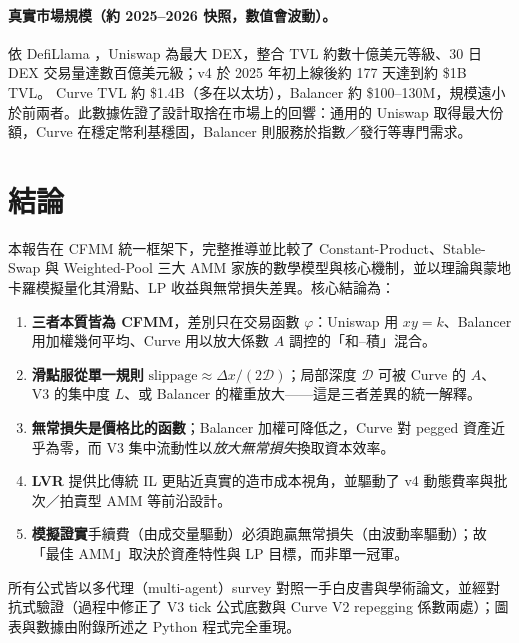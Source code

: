 \documentclass[11pt,a4paper]{article}
\begin{document}
\paragraph{真實市場規模（約 2025--2026 快照，數值會波動）。}
依 DefiLlama \citep{defillamauniswap,defillamacurve,defillamabalancer}，Uniswap 為最大 DEX，整合 TVL 約數十億美元等級、30 日 DEX 交易量達數百億美元級；v4 於 2025 年初上線後約 177 天達到約 \$1B TVL。
Curve TVL 約 \$1.4B（多在以太坊），Balancer 約 \$100--130M，規模遠小於前兩者。此數據佐證了設計取捨在市場上的回響：通用的 Uniswap 取得最大份額，Curve 在穩定幣利基穩固，Balancer 則服務於指數／發行等專門需求。

\section{結論}
本報告在 CFMM 統一框架下，完整推導並比較了 Constant-Product、Stable-Swap 與 Weighted-Pool 三大 AMM 家族的數學模型與核心機制，並以理論與蒙地卡羅模擬量化其滑點、LP 收益與無常損失差異。核心結論為：

\begin{enumerate}
  \item \textbf{三者本質皆為 CFMM}，差別只在交易函數 $\varphi$：Uniswap 用 $xy=k$、Balancer 用加權幾何平均、Curve 用以放大係數 $A$ 調控的「和--積」混合。
  \item \textbf{滑點服從單一規則} $\text{slippage}\approx\Delta x/(2\mathcal{D})$；局部深度 $\mathcal{D}$ 可被 Curve 的 $A$、V3 的集中度 $L$、或 Balancer 的權重放大——這是三者差異的統一解釋。
  \item \textbf{無常損失是價格比的函數}；Balancer 加權可降低之，Curve 對 pegged 資產近乎為零，而 V3 集中流動性以\emph{放大無常損失}換取資本效率。
  \item \textbf{LVR} 提供比傳統 IL 更貼近真實的造市成本視角，並驅動了 v4 動態費率與批次／拍賣型 AMM 等前沿設計。
  \item \textbf{模擬證實}手續費（由成交量驅動）必須跑贏無常損失（由波動率驅動）；故「最佳 AMM」取決於資產特性與 LP 目標，而非單一冠軍。
\end{enumerate}

所有公式皆以多代理（multi-agent）survey 對照一手白皮書與學術論文，並經對抗式驗證（過程中修正了 V3 tick 公式底數與 Curve V2 repegging 係數兩處）；圖表與數據由附錄所述之 Python 程式完全重現。

\end{document}
